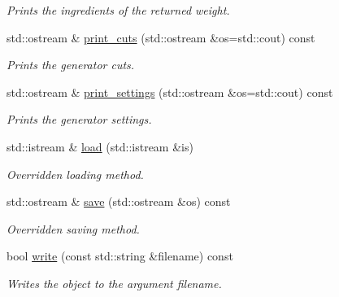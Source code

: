 \begin{DoxyCompactItemize}
\begin{DoxyCompactList}\small\item\em Prints the ingredients of the returned weight. \end{DoxyCompactList}\item 
\hypertarget{a00430_afa8b12752091958a7b2fd0f1fbc69c08}{std\-::ostream \& \hyperlink{a00430_afa8b12752091958a7b2fd0f1fbc69c08}{print\-\_\-cuts} (std\-::ostream \&os=std\-::cout) const }\label{a00430_afa8b12752091958a7b2fd0f1fbc69c08}

\begin{DoxyCompactList}\small\item\em Prints the generator cuts. \end{DoxyCompactList}\item 
\hypertarget{a00430_a609afaf01cf286a14aaf558a6517ec39}{std\-::ostream \& \hyperlink{a00430_a609afaf01cf286a14aaf558a6517ec39}{print\-\_\-settings} (std\-::ostream \&os=std\-::cout) const }\label{a00430_a609afaf01cf286a14aaf558a6517ec39}

\begin{DoxyCompactList}\small\item\em Prints the generator settings. \end{DoxyCompactList}\item 
\hypertarget{a00430_a82583956b01222747203c886bd546360}{std\-::istream \& \hyperlink{a00430_a82583956b01222747203c886bd546360}{load} (std\-::istream \&is)}\label{a00430_a82583956b01222747203c886bd546360}

\begin{DoxyCompactList}\small\item\em Overridden loading method. \end{DoxyCompactList}\item 
\hypertarget{a00430_a72bd05e9ca595d39541eff7c92a6264f}{std\-::ostream \& \hyperlink{a00430_a72bd05e9ca595d39541eff7c92a6264f}{save} (std\-::ostream \&os) const }\label{a00430_a72bd05e9ca595d39541eff7c92a6264f}

\begin{DoxyCompactList}\small\item\em Overridden saving method. \end{DoxyCompactList}\item 
\hypertarget{a00430_ab327834e6928401136a49fda9f0b7e61}{bool \hyperlink{a00430_ab327834e6928401136a49fda9f0b7e61}{write} (const std\-::string \&filename) const }\label{a00430_ab327834e6928401136a49fda9f0b7e61}

\begin{DoxyCompactList}\small\item\em Writes the object to the argument filename. \end{DoxyCompactList}\end{DoxyCompactItemize}
